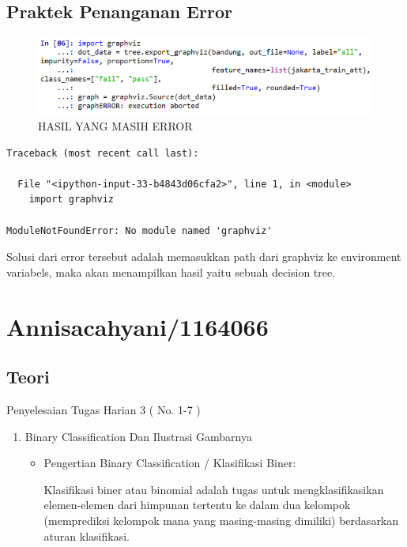 \begin{itemize}
\begin{enumerate}
\begin{itemize}
\end{itemize}
\end{enumerate}

\subsection{Praktek Penanganan Error}

\begin{figure}[ht]
\centering
\includegraphics[scale=0.4]{figures/AnnisaFathoroni-6.png}
\caption{HASIL YANG MASIH ERROR}
\label{contoh}
\end{figure}

\begin{verbatim}
Traceback (most recent call last):

  File "<ipython-input-33-b4843d06cfa2>", line 1, in <module>
    import graphviz

ModuleNotFoundError: No module named 'graphviz'
\end{verbatim}

Solusi dari error tersebut adalah memasukkan path dari graphviz ke environment variabels, maka akan menampilkan hasil yaitu sebuah decision tree.

\end{itemize}

\section{Annisacahyani/1164066}
\subsection{Teori}
Penyelesaian Tugas Harian 3 ( No. 1-7 )
\begin{enumerate}
\item Binary Classification Dan Ilustrasi Gambarnya
\begin{itemize}
\item Pengertian Binary Classification / Klasifikasi Biner:
\par Klasifikasi biner atau binomial adalah tugas untuk mengklasifikasikan elemen-elemen dari himpunan tertentu ke dalam dua kelompok (memprediksi kelompok mana yang masing-masing dimiliki) berdasarkan aturan klasifikasi.
\end{itemize}
\end{enumerate}

